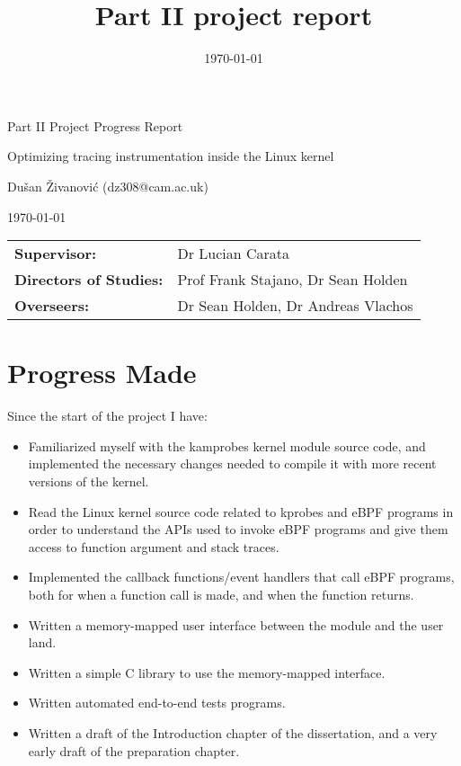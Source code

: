 \documentclass[12pt, A4]{article}
\title{Part II project report}
\date{\today}
\begin{document}
    \centerline{\large Part II Project Progress Report}
    \vspace{4mm}
    \centerline{\Large Optimizing tracing instrumentation inside the Linux kernel}
    \vspace{4mm}
    \centerline{\large Dušan Živanović (dz308@cam.ac.uk)}
    \vspace{4mm}
    \centerline{\large \today}
    \vspace{10mm}
    
    \hspace{-9mm}
    \begin{tabular}{l l}
        \bf{Supervisor:} & Dr Lucian Carata \\
        \bf{Directors of Studies:} & Prof Frank Stajano, Dr Sean Holden \\
        \bf{Overseers:} & Dr Sean Holden, Dr Andreas Vlachos \\
    \end{tabular}

    \section{Progress Made}
        Since the start of the project I have:
        \begin{itemize}
            \item Familiarized myself with the kamprobes kernel module source code, and implemented the necessary changes needed to compile it with more recent versions of the kernel.
            \item Read the Linux kernel source code related to kprobes and eBPF programs in order to understand the APIs used to invoke eBPF programs and give them access to function argument and stack traces.
            \item Implemented the callback functions/event handlers that call eBPF programs, both for when a function call is made, and when the function returns.
            \item Written a memory-mapped user interface between the module and the user land.
            \item Written a simple C library to use the memory-mapped interface.
            \item Written automated end-to-end tests programs.
            \item Written a draft of the Introduction chapter of the dissertation, and a very early draft of the preparation chapter.
        \end{itemize}
\end{document}
